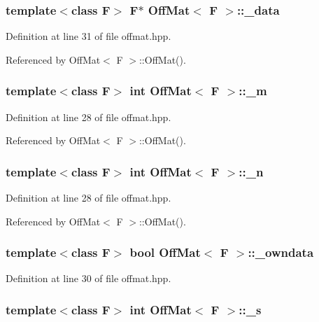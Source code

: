 \subsubsection{\setlength{\rightskip}{0pt plus 5cm}template$<$class F$>$ F$\ast$ {\bf Off\-Mat}$<$ F $>$::{\bf \_\-data}}\label{classOffMat_7125153abbcb2e949a1b4f81cbe22af5_7125153abbcb2e949a1b4f81cbe22af5}




Definition at line 31 of file offmat.hpp.

Referenced by Off\-Mat$<$ F $>$::Off\-Mat().
\subsubsection{\setlength{\rightskip}{0pt plus 5cm}template$<$class F$>$ int {\bf Off\-Mat}$<$ F $>$::{\bf \_\-m}}\label{classOffMat_b781ae81625400d76d94420d3af2c230_b781ae81625400d76d94420d3af2c230}




Definition at line 28 of file offmat.hpp.

Referenced by Off\-Mat$<$ F $>$::Off\-Mat().
\subsubsection{\setlength{\rightskip}{0pt plus 5cm}template$<$class F$>$ int {\bf Off\-Mat}$<$ F $>$::{\bf \_\-n}}\label{classOffMat_b628b96b5cc160f67acf6b4673cdd8bb_b628b96b5cc160f67acf6b4673cdd8bb}




Definition at line 28 of file offmat.hpp.

Referenced by Off\-Mat$<$ F $>$::Off\-Mat().
\subsubsection{\setlength{\rightskip}{0pt plus 5cm}template$<$class F$>$ bool {\bf Off\-Mat}$<$ F $>$::{\bf \_\-owndata}}\label{classOffMat_4a613b2956a4a0ffff962e497a5d56e0_4a613b2956a4a0ffff962e497a5d56e0}




Definition at line 30 of file offmat.hpp.
\subsubsection{\setlength{\rightskip}{0pt plus 5cm}template$<$class F$>$ int {\bf Off\-Mat}$<$ F $>$::{\bf \_\-s}}\label{classOffMat_c195aeabeeee007891190b9ff8a32c70_c195aeabeeee007891190b9ff8a32c70}




